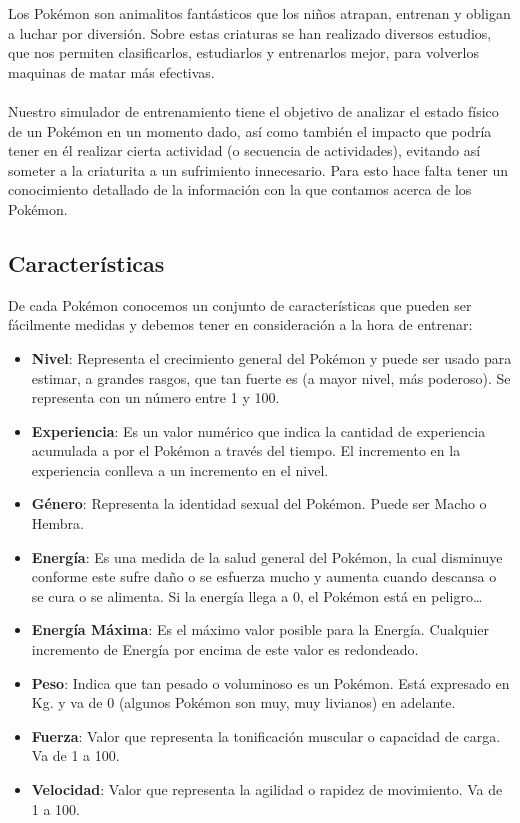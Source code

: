 \documentclass[spanish,a4paper]{article}
\begin{document}
Los Pokémon son animalitos fantásticos que los niños atrapan, entrenan y obligan a luchar por diversión. Sobre estas criaturas se han realizado diversos estudios, que nos permiten clasificarlos, estudiarlos y entrenarlos mejor, para volverlos maquinas de matar más efectivas.
\\\\
Nuestro simulador de entrenamiento tiene el objetivo de analizar el estado físico de un Pokémon en un momento dado, así como también el impacto que podría tener en él realizar cierta actividad (o secuencia de actividades), evitando así someter a la criaturita a un sufrimiento innecesario. Para esto hace falta tener un conocimiento detallado de la información con la que contamos acerca de los Pokémon.

\subsection{Características}

De cada Pokémon conocemos un conjunto de características que pueden ser fácilmente medidas y debemos tener en consideración a la hora de entrenar:

\begin{itemize}
\item \textbf{Nivel}: Representa el crecimiento general del Pokémon y puede ser usado para estimar, a grandes rasgos, que tan fuerte es (a mayor nivel, más poderoso). Se representa con un número entre 1 y 100.
\item \textbf{Experiencia}: Es un valor numérico que indica la cantidad de experiencia acumulada a por el Pokémon a través del tiempo. El incremento en la experiencia conlleva a un incremento en el nivel.
\item \textbf{Género}: Representa la identidad sexual del Pokémon. Puede ser Macho o Hembra.
\item \textbf{Energía}: Es una medida de la salud general del Pokémon, la cual disminuye conforme este sufre daño o se esfuerza mucho y aumenta cuando descansa o se cura o se alimenta. Si la energía llega a 0, el Pokémon está en peligro…
\item \textbf{Energía Máxima}: Es el máximo valor posible para la Energía. Cualquier incremento de Energía por encima de este valor es redondeado.
\item \textbf{Peso}: Indica que tan pesado o voluminoso es un Pokémon. Está expresado en Kg. y va de 0 (algunos Pokémon son muy, muy livianos) en adelante.
\item \textbf{Fuerza}: Valor que representa la tonificación muscular o capacidad de carga. Va de 1 a 100.
\item \textbf{Velocidad}: Valor que representa la agilidad o rapidez de movimiento. Va de 1 a 100.
\end{itemize}
\end{document}
